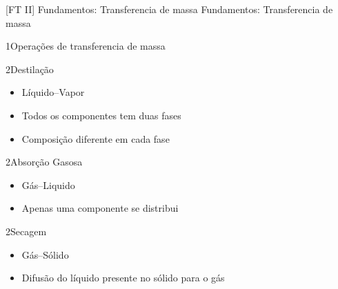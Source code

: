 \documentclass[\mainfilename]{subfiles}
\begin{document}

[FT II]
{Fundamentos: Transferencia de massa} %
{Fundamentos: Transferencia de massa} %

\begin{sectionBox}1{Operações de transferencia de massa} %
    



    \begin{multicols}{2}
            \begin{sectionBox}2{Destilação} %
                \begin{itemize}
                    \item Líquido--Vapor
                    \item Todos os componentes tem duas fases
                    \item Composição diferente em cada fase
                \end{itemize}
            \end{sectionBox}
        
            \begin{sectionBox}2{Absorção Gasosa} %
                \begin{itemize}
                    \item Gás--Liquido
                    \item Apenas uma componente se distribui
                \end{itemize}
            \end{sectionBox}
        
            \begin{sectionBox}2{Secagem} %
                \begin{itemize}
                    \item Gás--Sólido
                    \item Difusão do líquido presente no sólido para o gás
                \end{itemize}
            \end{sectionBox}


\end{multicols}
\end{sectionBox}
\end{document}

